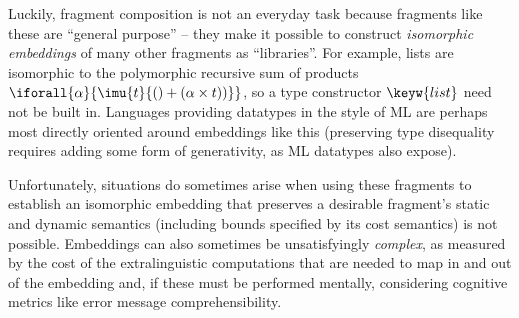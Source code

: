 Luckily, fragment composition is not an everyday task because fragments like these are ``general purpose'' -- they make it possible to construct \emph{isomorphic embeddings} of many other fragments as ``libraries''. For example, lists are isomorphic to  the polymorphic recursive sum of products $\iforall{\alpha}{\imu{t}{\iunit + (\alpha \times t))}}$, so a type constructor $\keyw{list}$ need not be built in. Languages providing datatypes in the style of ML  are perhaps most directly oriented around embeddings like this (preserving type disequality requires adding some form of generativity, as ML datatypes also expose). %

Unfortunately, situations do sometimes arise when using these fragments to establish an isomorphic embedding that preserves a desirable fragment's  static and dynamic semantics (including bounds specified by its cost semantics) is not possible. 
Embeddings can also sometimes be unsatisfyingly \emph{complex}, as measured by the cost of the extralinguistic computations that are needed to map in and out of the embedding and, if these  must be performed mentally, considering  cognitive metrics like  error message comprehensibility. %

